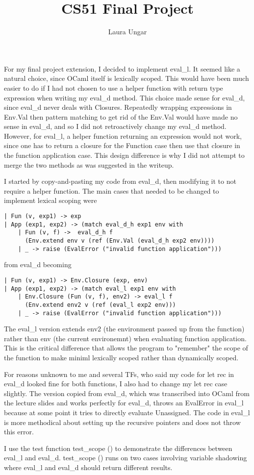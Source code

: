 \documentclass{article}
\title{CS51 Final Project}
\author{Laura Ungar}
\begin{document}
\maketitle

For my final project extension, I decided to implement eval\_l. It seemed like a natural choice, since OCaml itself is lexically scoped. This would have been much easier to do if I had not chosen to use a helper function with return type expression when writing my eval\_d method. This choice made sense for eval\_d, since eval\_d never deals with Closures. Repeatedly wrapping expressions in Env.Val then pattern matching to get rid of the Env.Val would have made no sense in eval\_d, and so I did not retroactively change my eval\_d method. However, for eval\_l, a helper function returning an expression would not work, since one has to return a closure for the Function case then use that closure in the function application case. This design difference is why I did not attempt to merge the two methods as was suggested in the writeup.

I started by copy-and-pasting my code from eval\_d, then modifying it to not require a helper function. The main cases that needed to be changed to implement lexical scoping were 
\begin{verbatim}
| Fun (v, exp1) -> exp
| App (exp1, exp2) -> (match eval_d_h exp1 env with
    | Fun (v, f) ->  eval_d_h f 
      (Env.extend env v (ref (Env.Val (eval_d_h exp2 env))))
    | _ -> raise (EvalError ("invalid function application")))
\end{verbatim}
from eval\_d becoming
\begin{verbatim}
| Fun (v, exp1) -> Env.Closure (exp, env)
| App (exp1, exp2) -> (match eval_l exp1 env with
    | Env.Closure (Fun (v, f), env2) -> eval_l f 
      (Env.extend env2 v (ref (eval_l exp2 env)))
    | _ -> raise (EvalError ("invalid function application")))
\end{verbatim}
The eval\_l version extends env2 (the environment passed up from the function) rather than env (the current environemnt) when evaluating function application. This is the critical difference that allows the program to "remember" the scope of the function to make miniml lexically scoped rather than dynamically scoped.

For reasons unknown to me and several TFs, who said my code for let rec in eval\_d looked fine for both functions, I also had to change my let rec case slightly. The version copied from eval\_d, which was transcribed into OCaml from the lecture slides and works perfectly for eval\_d, throws an EvalError in eval\_l because at some point it tries to directly evaluate Unassigned. The code in eval\_l is more methodical about setting up the recursive pointers and does not throw this error.

I use the test function test\_scope () to demonstrate the differences between eval\_l and eval\_d. test\_scope () runs on two cases involving variable shadowing where eval\_l and eval\_d should return different results.
\end{document}
